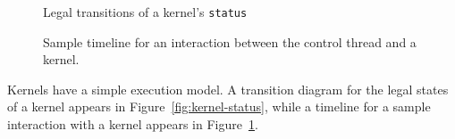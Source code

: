 

\callc
\makeline
{}




\callc
\makeline

\clearpage
\begin{figure}[t]
\begin{minipage}{6in}
\vspace{-6pt}
\begin{center}
\end{center}
\vspace{-16pt}
\caption{Legal transitions of a kernel's {\tt status} \protect\label{fig:kernel-status}}
\end{minipage}
\vspace{28pt}

\begin{minipage}{6in}
\begin{center}
\end{center}
\vspace{-16pt}
\caption{Sample timeline for an interaction between the control thread and a kernel. \protect\label{fig:kernel-timeline}}
\end{minipage}
\end{figure}
\clearpage


Kernels have a simple execution model. A transition diagram for the
legal states of a kernel appears in Figure~\ref{fig:kernel-status},
while a timeline for a sample interaction with a kernel appears in
Figure~\ref{fig:kernel-timeline}.

